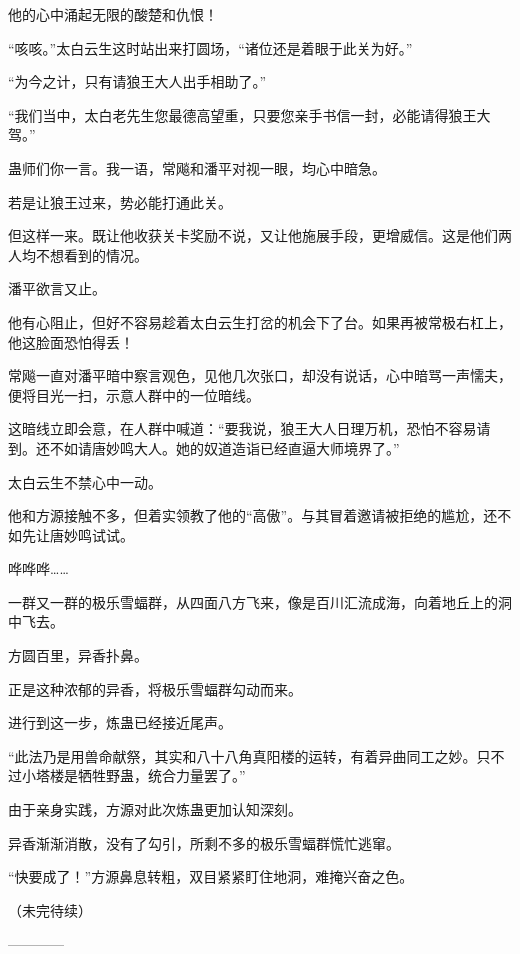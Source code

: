 \begin{this_body}
他的心中涌起无限的酸楚和仇恨！

“咳咳。”太白云生这时站出来打圆场，“诸位还是着眼于此关为好。”

“为今之计，只有请狼王大人出手相助了。”

“我们当中，太白老先生您最德高望重，只要您亲手书信一封，必能请得狼王大驾。”

蛊师们你一言。我一语，常飚和潘平对视一眼，均心中暗急。

若是让狼王过来，势必能打通此关。

但这样一来。既让他收获关卡奖励不说，又让他施展手段，更增威信。这是他们两人均不想看到的情况。

潘平欲言又止。

他有心阻止，但好不容易趁着太白云生打岔的机会下了台。如果再被常极右杠上，他这脸面恐怕得丢！

常飚一直对潘平暗中察言观色，见他几次张口，却没有说话，心中暗骂一声懦夫，便将目光一扫，示意人群中的一位暗线。

这暗线立即会意，在人群中喊道：“要我说，狼王大人日理万机，恐怕不容易请到。还不如请唐妙鸣大人。她的奴道造诣已经直逼大师境界了。”

太白云生不禁心中一动。

他和方源接触不多，但着实领教了他的“高傲”。与其冒着邀请被拒绝的尴尬，还不如先让唐妙鸣试试。

哗哗哗……

一群又一群的极乐雪蝠群，从四面八方飞来，像是百川汇流成海，向着地丘上的洞中飞去。

方圆百里，异香扑鼻。

正是这种浓郁的异香，将极乐雪蝠群勾动而来。

进行到这一步，炼蛊已经接近尾声。

“此法乃是用兽命献祭，其实和八十八角真阳楼的运转，有着异曲同工之妙。只不过小塔楼是牺牲野蛊，统合力量罢了。”

由于亲身实践，方源对此次炼蛊更加认知深刻。

异香渐渐消散，没有了勾引，所剩不多的极乐雪蝠群慌忙逃窜。

“快要成了！”方源鼻息转粗，双目紧紧盯住地洞，难掩兴奋之色。

（未完待续）

------------

\end{this_body}

